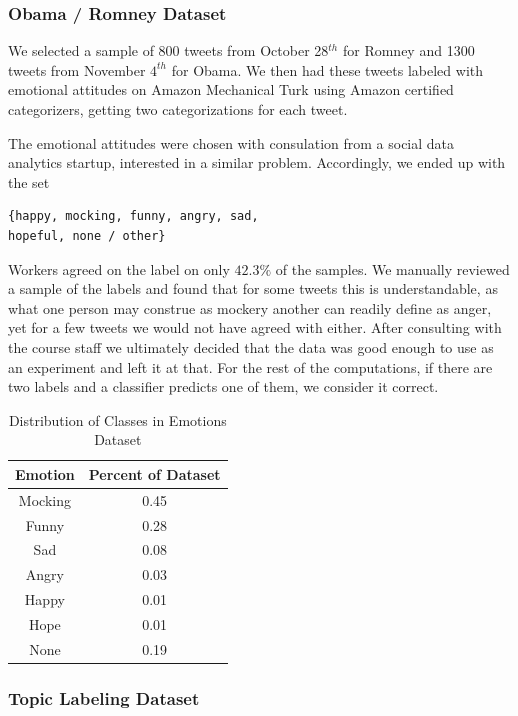 \documentclass[fontsize=10pt,twocolumn,letterpaper,abstracton]{scrartcl}
\begin{document}
\subsubsection{Obama / Romney Dataset}

We selected a sample of 800 tweets from October 28$^{th}$ for Romney and 1300 tweets from November $4^{th}$ for Obama. We then had these tweets labeled with emotional attitudes on Amazon Mechanical Turk using Amazon certified categorizers, getting two categorizations for each tweet.

The emotional attitudes were chosen with consulation from a social data analytics startup, interested in a similar problem. Accordingly, we ended up with the set

\begin{verbatim}
{happy, mocking, funny, angry, sad,
hopeful, none / other}
\end{verbatim}

Workers agreed on the label on only $42.3\%$ of the samples. We manually reviewed a sample of the labels and found that for some tweets this is understandable, as what one person may construe as mockery another can readily define as anger, yet for a few tweets we would not have agreed with either. After consulting with the course staff we ultimately decided that the data was good enough to use as an experiment and left it at that. For the rest of the computations, if there are two labels and a classifier predicts one of them, we consider it correct.


\begin{table}
\centering
\begin{tabular}{ c | c }
Emotion & Percent of Dataset\\
\hline
Mocking & 0.45 \\
Funny & 0.28\\
Sad & 0.08\\
Angry & 0.03\\
Happy & 0.01\\
Hope & 0.01\\
None & 0.19\\
\end{tabular}
\caption{Distribution of Classes in Emotions Dataset}
\label{tb:emotdist}
\end{table}


\subsubsection{Topic Labeling Dataset}
\end{document}
